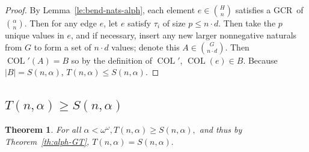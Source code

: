 \documentclass[10pt,a4paper]{article}
\newcommand{\om}{\omega}
\newcommand{\COL}{\operatorname{COL}}
\newcommand{\gencrulenospace}{GCR}
\newcommand{\gencrule}{\gencrulenospace~}
\newcommand{\numpoints}{n}
\newcommand{\Commonconst}{A}
\newcommand{\Rareconst}{B}
\theoremstyle{plain}
\newtheorem{theorem}{Theorem}[section]
\theoremstyle{definition}
\begin{document}
\begin{proof}
By Lemma~\ref{le:bend-nats-alph}, each element $e \in \binom{H}{\numpoints}$ satisfies a \gencrule of $\binom{\alpha}{\numpoints}$. 
Then for any edge $e$, let $e$ satisfy $\tau_i$ of size $p \leq \numpoints \cdot d$.
Then take the $p$ unique values in $e$, and if necessary, insert any new larger nonnegative naturals from 
$G$ to form a set of $\numpoints \cdot d$ values; denote this $\Commonconst \in \binom{G}{\numpoints \cdot d}$. 
Then
$\COL'(\Commonconst) = \Rareconst$ so by the definition of $\COL'$, $\COL(e) \in \Rareconst$. 
Because $|\Rareconst| = S(\numpoints, \alpha)$, $T(\numpoints,\alpha) \leq S(\numpoints, \alpha)$.
\end{proof}

\subsection{\texorpdfstring{$T(\numpoints,\alpha)\geq S(\numpoints,\alpha)$}{T(\numpoints, alpha) >= S(\numpoints, alpha)}}

\begin{theorem}
    \label{th:alph-LT}
    For all $\alpha < \om^\om, T\left(\numpoints, \alpha\right) \geq S\left(\numpoints, \alpha\right),$
    and thus by Theorem~\ref{th:alph-GT}, $T\left(\numpoints, \alpha\right) = S\left(\numpoints, \alpha\right).$
\end{theorem}
\end{document}
